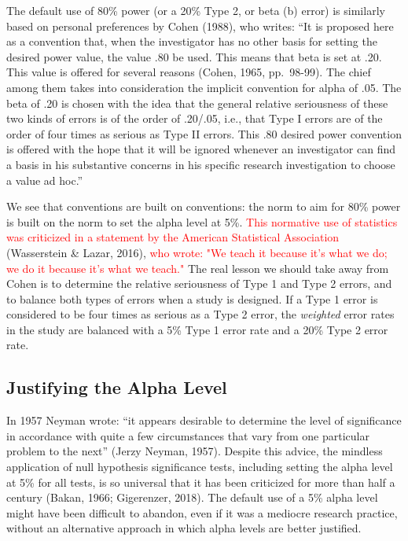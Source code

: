 \documentclass[
  english,
  ,man, a4paper,floatsintext]{apa6}
\begin{document}
The default use of 80\% power (or a 20\% Type 2, or beta (b) error) is similarly based on personal preferences by Cohen (1988), who writes: ``It is proposed here as a convention that, when the investigator has no other basis for setting the desired power value, the value .80 be used. This means that beta is set at .20. This value is offered for several reasons (Cohen, 1965, pp.~98-99). The chief among them takes into consideration the implicit convention for alpha of .05. The beta of .20 is chosen with the idea that the general relative seriousness of these two kinds of errors is of the order of .20/.05, i.e., that Type I errors are of the order of four times as serious as Type II errors. This .80 desired power convention is offered with the hope that it will be ignored whenever an investigator can find a basis in his substantive concerns in his specific research investigation to choose a value ad hoc.''

We see that conventions are built on conventions: the norm to aim for 80\% power is built on the norm to set the alpha level at 5\%. \textcolor{red}{This normative use of statistics was criticized in a statement by the American Statistical Association} (Wasserstein \& Lazar, 2016), \textcolor{red}{who wrote: "We teach it because it’s what we do; we do it because it’s what we teach."} The real lesson we should take away from Cohen is to determine the relative seriousness of Type 1 and Type 2 errors, and to balance both types of errors when a study is designed. If a Type 1 error is considered to be four times as serious as a Type 2 error, the \emph{weighted} error rates in the study are balanced with a 5\% Type 1 error rate and a 20\% Type 2 error rate.

\hypertarget{justifying-the-alpha-level}{%
\subsection{Justifying the Alpha Level}\label{justifying-the-alpha-level}}

In 1957 Neyman wrote: ``it appears desirable to determine the level of significance in accordance with quite a few circumstances that vary from one particular problem to the next'' (Jerzy Neyman, 1957). Despite this advice, the mindless application of null hypothesis significance tests, including setting the alpha level at 5\% for all tests, is so universal that it has been criticized for more than half a century (Bakan, 1966; Gigerenzer, 2018). The default use of a 5\% alpha level might have been difficult to abandon, even if it was a mediocre research practice, without an alternative approach in which alpha levels are better justified.
\end{document}
